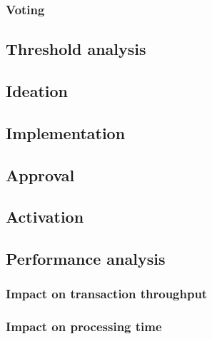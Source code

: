\documentclass[11pt,a4paper]{article}
\begin{document}
\subsubsection{Voting}
\label{sec:voting}


\subsection{Threshold analysis}
\label{sec:threshold-analysis}

\subsection{Ideation}
\label{sec:ideation}

\subsection{Implementation}
\label{sec:implementation}

\subsection{Approval}
\label{sec:approval}

\subsection{Activation}
\label{sec:activation}


\subsection{Performance analysis}
\label{sec:performance-analysis}

\subsubsection{Impact on transaction throughput}
\label{sec:impact-trans-thro}

\subsubsection{Impact on processing time}
\label{sec:impact-proc-time}
\end{document}
